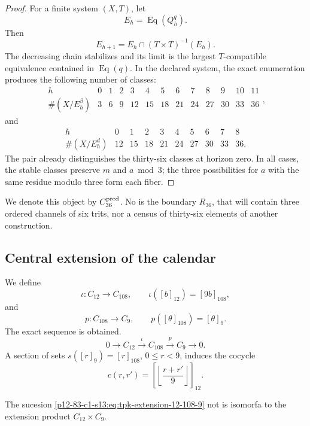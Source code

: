 \begin{proof}
For a finite system \((X,T)\), let
\[
 E_h=\operatorname{Eq}(Q_h^q).
\]
Then
\[
 E_{h+1}=E_h\cap(T\times T)^{-1}(E_h).
\]
The decreasing chain stabilizes and its limit is the largest
\(T\)-compatible equivalence contained in \(\operatorname{Eq}(q)\). In the declared
system, the exact enumeration produces the following number of classes:
\[
\begin{array}{c|rrrrrrrrrrrr}
h&0&1&2&3&4&5&6&7&8&9&10&11\\\hline
\#(X/E_h^{\beta})&3&6&9&12&15&18&21&24&27&30&33&36
\end{array},
\]
and
\[
\begin{array}{c|rrrrrrrrr}
h&0&1&2&3&4&5&6&7&8\\\hline
\#(X/E_h^{d})&12&15&18&21&24&27&30&33&36.
\end{array}
\]
The pair already distinguishes the thirty-six classes at horizon zero. In all
cases, the stable classes preserve \(m\) and \(a\bmod3\); the three
possibilities for \(a\) with the same residue modulo three form each fiber.
\end{proof}

We denote this object by \(C_{36}^{\rm pred}\). No is the boundary
\(R_{36}\), that will contain three ordered channels of six trits, nor a census
of thirty-six elements of another construction.

\subsection{Central extension of the calendar}

We define
\[
 \iota:C_{12}\longrightarrow C_{108},
 \qquad \iota([b]_{12})=[9b]_{108},
\]
and
\[
 p:C_{108}\longrightarrow C_9,
 \qquad p([\theta]_{108})=[\theta]_9.
\]
The exact sequence is obtained.
\begin{equation}
 0\longrightarrow C_{12}
 \xrightarrow{\ \iota\ }C_{108}
 \xrightarrow{\ p\ }C_9
 \longrightarrow0.
\label{p12-83-c1-s13:eq:tpk-extension-12-108-9}
\end{equation}
A section of sets \(s([r]_9)=[r]_{108}\),
\(0\leq r<9\), induces the cocycle
\[
 c(r,r')=
 \left[\left\lfloor\frac{r+r'}{9}\right\rfloor\right]_{12}.
\]

\begin{proposition}
\label{p12-83-c1-s13:prop:tpk-extension-no-escindida}
The sucesion \cref{p12-83-c1-s13:eq:tpk-extension-12-108-9} not is isomorfa to the extension
product \(C_{12}\times C_9\).
\end{proposition}

